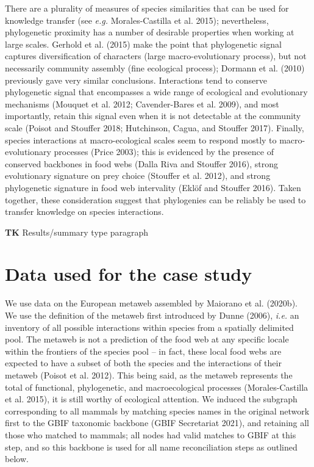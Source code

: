 \documentclass[11pt]{article}
\begin{document}
There are a plurality of measures of species similarities that can be
used for knowledge transfer (see \emph{e.g.} Morales-Castilla et al.
2015); nevertheless, phylogenetic proximity has a number of desirable
properties when working at large scales. Gerhold et al. (2015) make the
point that phylogenetic signal captures diversification of characters
(large macro-evolutionary process), but not necessarily community
assembly (fine ecological process); Dormann et al. (2010) previously
gave very similar conclusions. Interactions tend to conserve
phylogenetic signal that encompasses a wide range of ecological and
evolutionary mechanisms (Mouquet et al. 2012; Cavender-Bares et al.
2009), and most importantly, retain this signal even when it is not
detectable at the community scale (Poisot and Stouffer 2018; Hutchinson,
Cagua, and Stouffer 2017). Finally, species interactions at
macro-ecological scales seem to respond mostly to macro-evolutionary
processes (Price 2003); this is evidenced by the presence of conserved
backbones in food webs (Dalla Riva and Stouffer 2016), strong
evolutionary signature on prey choice (Stouffer et al. 2012), and strong
phylogenetic signature in food web intervality (Eklöf and Stouffer
2016). Taken together, these consideration suggest that phylogenies can
be reliably be used to transfer knowledge on species interactions.

\textbf{TK} Results/summary type paragraph

\hypertarget{data-used-for-the-case-study}{%
\section{Data used for the case
study}\label{data-used-for-the-case-study}}

We use data on the European metaweb assembled by Maiorano et al.
(2020b). We use the definition of the metaweb first introduced by Dunne
(2006), \emph{i.e.} an inventory of all possible interactions within
species from a spatially delimited pool. The metaweb is not a prediction
of the food web at any specific locale within the frontiers of the
species pool -- in fact, these local food webs are expected to have a
subset of both the species and the interactions of their metaweb (Poisot
et al. 2012). This being said, as the metaweb represents the total of
functional, phylogenetic, and macroecological processes
(Morales-Castilla et al. 2015), it is still worthy of ecological
attention. We induced the subgraph corresponding to all mammals by
matching species names in the original network first to the GBIF
taxonomic backbone (GBIF Secretariat 2021), and retaining all those who
matched to mammals; all nodes had valid matches to GBIF at this step,
and so this backbone is used for all name reconciliation steps as
outlined below.
\end{document}

